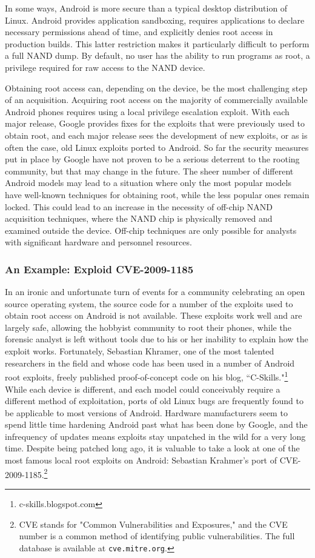 In some ways, Android is more secure than a typical desktop distribution of Linux.  Android provides application sandboxing,
requires applications to declare necessary permissions ahead of time, and explicitly denies root access in production builds. This
latter restriction makes it particularly difficult to perform a full NAND dump.  By default, no user has the ability to run programs
as root, a privilege required for raw access to the NAND device.  

Obtaining root access can, depending on the device, be the most challenging step of an acquisition.  Acquiring root access on the
majority of commercially available Android phones requires using a local privilege escalation exploit.  With each major release,
Google provides fixes for the exploits that were previously used to obtain root, and each major release sees the development of new
exploits, or as is often the case, old Linux exploits ported to Android.  So far the security measures put in place by Google have
not proven to be a serious deterrent to the rooting community, but that may change in the future.  The sheer number of different
Android models may lead to a situation where only the most popular models have well-known techniques for obtaining root, while the
less popular ones remain locked.  This could lead to an increase in the necessity of off-chip NAND acquisition techniques, where the
NAND chip is physically removed and examined outside the device.  Off-chip techniques are only possible for analysts with
significant hardware and personnel resources.

\subsubsection{An Example: Exploid CVE-2009-1185}
In an ironic and unfortunate turn of events for a community celebrating an open source operating system, the source code for a
number of the exploits used to obtain root access on Android is not available.  These exploits work well and are largely safe,
allowing the hobbyist community to root their phones, while the forensic analyst is left without tools due to his or her inability
to explain how the exploit works.  Fortunately, Sebastian Khramer, one of the most talented researchers in the field and whose code has been used in a
number of Android root exploits, freely published proof-of-concept code on his blog, ``C-Skills."\footnote{c-skills.blogspot.com}
While each device is different, and each model could conceivably require a different method of exploitation, ports of old Linux bugs
are frequently found to be applicable to most versions of Android.  Hardware manufacturers seem to spend little time hardening
Android past what has been done by Google, and the infrequency of updates means exploits stay unpatched in the wild for a very long
time. Despite being patched long ago, it is valuable to take a look at one of the most famous local root exploits on Android:
Sebastian Krahmer's port of CVE-2009-1185.\footnote{CVE stands for "Common Vulnerabilities and Exposures," and the CVE number is a
common method of identifying public vulnerabilities. The full database is available at \texttt{cve.mitre.org}. }
 
